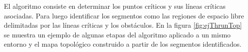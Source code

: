 El algoritmo consiste en determinar los puntos críticos y sus líneas críticas
asociadas. Para luego identificar los segmentos como las regiones de espacio
libre delimitadas por las líneas críticas y los obstáculos. En la figura
\ref{fig:ejThrunTop} se muestra un ejemplo de algunas etapas del algoritmo
aplicado a un mismo entorno y el mapa topológico construido a partir de los segmentos identificados.

\begin{figure}[H]
  \centering
  \qquad
  \qquad
  \qquad

\end{figure}
